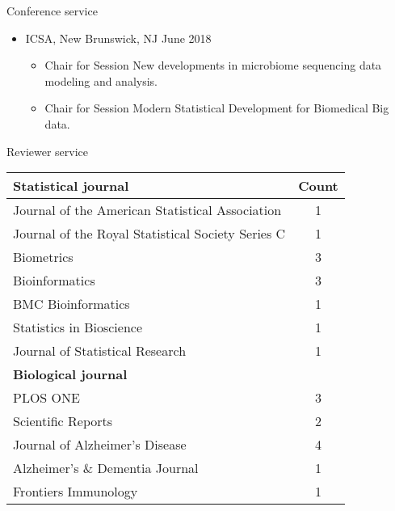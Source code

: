\documentclass{resume} %
\begin{document}


\begin{rSection}{Conference service}

\begin{itemize}[noitemsep,topsep=0pt]

\item  ICSA, New Brunswick, NJ  \hfill {June 2018}
\begin{itemize}[noitemsep,topsep=0pt]
\item{Chair for Session New developments in microbiome sequencing data modeling and analysis.}
\item{Chair for Session Modern Statistical Development for Biomedical Big data.}
\end{itemize}


\end{itemize}

\end{rSection}


\begin{rSection}{Reviewer service}

\begin{table}[htp]
\begin{center}
\begin{tabular}{l c }
\hline
\hline
\bf{Statistical journal} & Count \\
\hline
Journal of the American Statistical Association & 1 \\
Journal of the Royal Statistical Society Series C & 1 \\
Biometrics & 3 \\
Bioinformatics & 3 \\
BMC Bioinformatics & 1 \\
Statistics in Bioscience & 1 \\
Journal of Statistical Research & 1 \\
\hline
\hline
\bf{Biological journal} &  \\
\hline
PLOS ONE & 3 \\
Scientific Reports & 2 \\
Journal of Alzheimer's Disease & 4 \\
Alzheimer's \& Dementia Journal & 1 \\
Frontiers Immunology & 1 \\
\hline
\hline
\end{tabular}
\end{center}
\label{default}
\end{table}%


\end{rSection}
\end{document}
